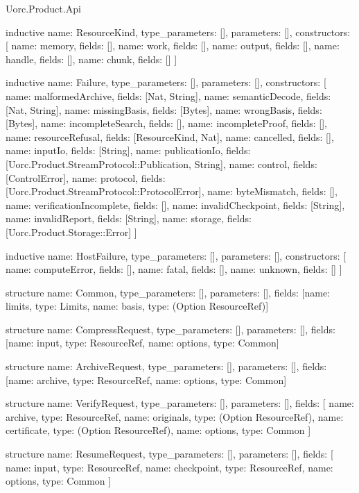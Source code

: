\begin{lexlean}{Uorc.Product.Api}
\begin{semanticmodule}
inductive{
  name: ResourceKind,
  type_parameters: [],
  parameters: [],
  constructors: [
    {name: memory, fields: []},
    {name: work, fields: []},
    {name: output, fields: []},
    {name: handle, fields: []},
    {name: chunk, fields: []}
  ]
}

inductive{
  name: Failure,
  type_parameters: [],
  parameters: [],
  constructors: [
    {name: malformedArchive, fields: [Nat, String]},
    {name: semanticDecode, fields: [Nat, String]},
    {name: missingBasis, fields: [Bytes]},
    {name: wrongBasis, fields: [Bytes]},
    {name: incompleteSearch, fields: []},
    {name: incompleteProof, fields: []},
    {name: resourceRefusal, fields: [ResourceKind, Nat]},
    {name: cancelled, fields: []},
    {name: inputIo, fields: [String]},
    {name: publicationIo, fields: [Uorc.Product.StreamProtocol::Publication, String]},
    {name: control, fields: [ControlError]},
    {name: protocol, fields: [Uorc.Product.StreamProtocol::ProtocolError]},
    {name: byteMismatch, fields: []},
    {name: verificationIncomplete, fields: []},
    {name: invalidCheckpoint, fields: [String]},
    {name: invalidReport, fields: [String]},
    {name: storage, fields: [Uorc.Product.Storage::Error]}
  ]
}

inductive{
  name: HostFailure,
  type_parameters: [],
  parameters: [],
  constructors: [
    {name: computeError, fields: []},
    {name: fatal, fields: []},
    {name: unknown, fields: []}
  ]
}

structure{
  name: Common,
  type_parameters: [],
  parameters: [],
  fields: [{name: limits, type: Limits}, {name: basis, type: (Option ResourceRef)}]
}

structure{
  name: CompressRequest,
  type_parameters: [],
  parameters: [],
  fields: [{name: input, type: ResourceRef}, {name: options, type: Common}]
}

structure{
  name: ArchiveRequest,
  type_parameters: [],
  parameters: [],
  fields: [{name: archive, type: ResourceRef}, {name: options, type: Common}]
}

structure{
  name: VerifyRequest,
  type_parameters: [],
  parameters: [],
  fields: [
    {name: archive, type: ResourceRef},
    {name: originals, type: (Option ResourceRef)},
    {name: certificate, type: (Option ResourceRef)},
    {name: options, type: Common}
  ]
}

structure{
  name: ResumeRequest,
  type_parameters: [],
  parameters: [],
  fields: [
    {name: input, type: ResourceRef},
    {name: checkpoint, type: ResourceRef},
    {name: options, type: Common}
  ]
}


\end{semanticmodule}
\end{lexlean}
